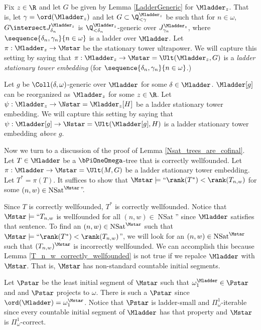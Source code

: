 \documentclass[oneside,12pt]{amsart}
\DeclareMathOperator{\NSat}{NSat}
\begin{document}
\begin{definition}
\label{LadderStationaryTowerEmbedding}
Fix $z\in\R$ and let $G$ be given by Lemma \ref{LadderGeneric} for $\Mladder_z$. That is,
let $\gamma=\ord(\Mladder_z)$ and let $G\subset \Q_{<\gamma}^{\Mladder_z}$ be such that for
$n\in\omega$, $G\intersect J^{\Mladder_z}_{\delta_n}$ is
$\Q_{<\delta_n}^{\Mladder_z}$-generic over $J^{\Mladder_z}_{\gamma_n}$, where
$\sequence{\delta_n,\gamma_n}{n\in\omega}$ is a ladder over $\Mladder$.
Let $\pi:\Mladder_z\to\Mstar$ be the stationary tower ultrapower.
We will capture this setting by saying that  $\pi:\Mladder_z\to\Mstar=\Ult(\Mladder_z,G)$
is a \emph{ladder stationary tower embedding} (for $\sequence{\delta_n,\gamma_n}{n\in\omega}$.)

Let $g$ be $\Coll(\delta,\omega)$-generic over $\Mladder$ for some
$\delta\in\Mladder$.
$\Mladder[g]$ can be reorganized as $\Mladder_z$ for some $z\in\R$.
Let $\psi:\Mladder_z\to\Nstar=\Mladder_z[H]$ be a ladder stationary tower embedding.
We will capture this setting by saying that
$\psi:\Mladder[g]\to\Nstar=\Ult(\Mladder[g],H)$ is a ladder stationary tower embedding \emph{above $g$}.
\end{definition}

Now we turn to a discussion of the proof of Lemma \ref{Nsat_trees_are_cofinal}.
Let $T\in\Mladder$ be a $\bPiOneOmega$-tree that is correctly wellfounded.
Let $\pi:\Mladder\to\Mstar=\Ult(M,G)$ be a ladder stationary tower embedding.
Let $T^* = \pi(T)$. It suffices to show that
$\Mstar\models\text{``}\rank(T^*) < \rank(T_{n,w})$ for some $(n,w)\in \NSat^{\Mstar}$''.

Since $T$ is correctly wellfounded, $T^*$ is correctly wellfounded.
Notice that $\Mstar\models\text{``}T_{n,w}$ is wellfounded for all $(n,w)\in \NSat$''
since $\Mladder$ satisfies that sentence. To find an $(n,w)\in \NSat^{\Mstar}$ such that
$\Mstar\models\text{``}\rank(T^*) < \rank(T_{n,w})$'', we will look for an
$(n,w)\in \NSat^{\Mstar}$
such that $(T_{n,w})^{\Mstar}$ is incorrectly wellfounded.
We can accomplish this because Lemma \ref{T_n_w_correctly_wellfounded} is not
true if we repalce $\Mladder$ with $\Mstar$. That is, $\Mstar$ has non-standard
countable initial segments.

Let $\Pstar$ be the least initial segment of $\Mstar$ such that
$\omega_1^{\Mladder}\in\Pstar$ and
and $\Pstar$ projects to $\omega$. There is such a $\Pstar$ since
$\ord(\Mladder)=\omega_1^{\Mstar}$. Notice that $\Pstar$ is ladder-small and
$\Pi^1_{\omega}$-iterable since every countable initial segment of $\Mladder$
has that property and $\Mstar$ is $\Pi^1_{\omega}$-correct.
\end{document}

